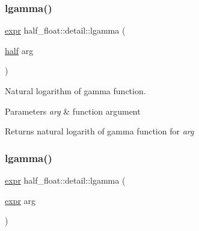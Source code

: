 \mbox{\label{namespacehalf__float_1_1detail_a7cf73acde909ef9f522b49f47e54843f}} 
\subsubsection{\texorpdfstring{lgamma()}{lgamma()}\hspace{0.1cm}{\footnotesize\ttfamily [1/2]}}
{\footnotesize\ttfamily \hyperlink{structhalf__float_1_1detail_1_1expr}{expr} half\+\_\+float\+::detail\+::lgamma (\begin{DoxyParamCaption}\item[{\hyperlink{classhalf__float_1_1half}{half}}]{arg }\end{DoxyParamCaption})\hspace{0.3cm}{\ttfamily [inline]}}

Natural logarithm of gamma function. 
\begin{DoxyParams}{Parameters}
{\em arg} & function argument \\
\hline
\end{DoxyParams}
\begin{DoxyReturn}{Returns}
natural logarith of gamma function for {\itshape arg} 
\end{DoxyReturn}
\mbox{\label{namespacehalf__float_1_1detail_aa53d3da977e832380b5b42d7d9f08743}} 
\subsubsection{\texorpdfstring{lgamma()}{lgamma()}\hspace{0.1cm}{\footnotesize\ttfamily [2/2]}}
{\footnotesize\ttfamily \hyperlink{structhalf__float_1_1detail_1_1expr}{expr} half\+\_\+float\+::detail\+::lgamma (\begin{DoxyParamCaption}\item[{\hyperlink{structhalf__float_1_1detail_1_1expr}{expr}}]{arg }\end{DoxyParamCaption})\hspace{0.3cm}{\ttfamily [inline]}}

\mbox{\label{namespacehalf__float_1_1detail_aae4eda4733dc4a863b635473008d9bc0}} 
